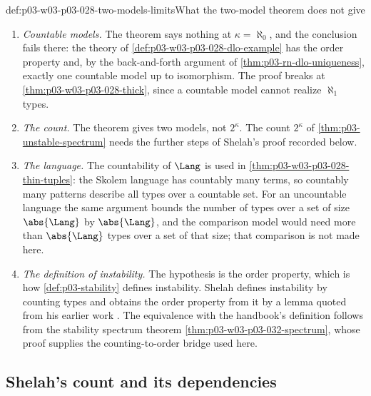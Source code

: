 \begin{hbwarning}{def:p03-w03-p03-028-two-models-limits}{What the two-model theorem does not give}
\begin{enumerate}
\item \emph{Countable models.}  The theorem says nothing at
\(\kappa=\aleph_0\), and the conclusion fails there: the theory of
\cref{def:p03-w03-p03-028-dlo-example} has the order property and, by
the back-and-forth argument of \cref{thm:p03-rn-dlo-uniqueness}, exactly
one countable model up to isomorphism.  The proof breaks at \cref{thm:p03-w03-p03-028-thick}, since a
countable model cannot realize \(\aleph_1\) types.
\item \emph{The count.}  The theorem gives two models, not \(2^\kappa\).
The count \(2^\kappa\) of \cref{thm:p03-unstable-spectrum} needs the
further steps of Shelah's proof recorded below.
\item \emph{The language.}  The countability of \(\Lang\) is used in
\cref{thm:p03-w03-p03-028-thin-tuples}: the Skolem language has countably
many terms, so countably many patterns describe all types over a countable
set.  For an uncountable language the same argument bounds the number of
types over a set of size \(\abs{\Lang}\) by \(\abs{\Lang}\), and the
comparison model would need more than \(\abs{\Lang}\) types over a set of
that size; that comparison is not made here.
\item \emph{The definition of instability.}  The hypothesis is the order
property, which is how \cref{def:p03-stability} defines instability.
Shelah defines instability by counting types and obtains the order property
from it by a lemma quoted from his earlier work
\cite[Lemma~1.1, p.~475]{Shelah1971NonIsomorphicModels}.  The equivalence
with the handbook's definition follows from the stability spectrum theorem
\cref{thm:p03-w03-p03-032-spectrum}, whose proof supplies the counting-to-order
bridge used here.
\end{enumerate}
\end{hbwarning}

\subsection{Shelah's count and its dependencies}
\label{sec:p03-w03-p03-028-shelah}

